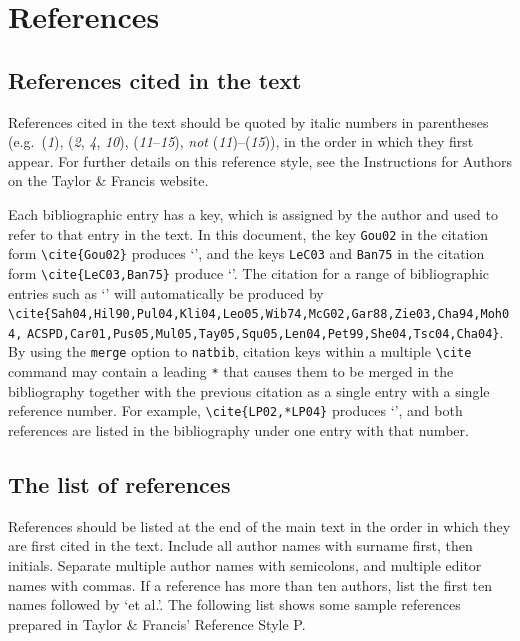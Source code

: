 \documentclass[]{interact}
\theoremstyle{plain}%
\theoremstyle{definition}
\theoremstyle{remark}
\begin{document}
\section{References}

\subsection{References cited in the text}

References cited in the text should be quoted by italic numbers in parentheses (e.g.\ (\textit{1}), (\textit{2}, \textit{4}, \textit{10}), (\textit{11}--\textit{15}), \emph{not} (\textit{11})--(\textit{15})), in the order in which they first appear. For further details on this reference style, see the Instructions for Authors on the Taylor \& Francis website.

Each bibliographic entry has a key, which is assigned by the author and used to refer to that entry in the text. In this document, the key \verb"Gou02" in the citation form \verb"\cite{Gou02}" produces `\cite{Gou02}', and the keys \verb"LeC03" and \verb"Ban75" in the citation form \verb"\cite{LeC03,Ban75}" produce `\cite{LeC03,Ban75}'. The citation for a range of bibliographic entries such as `\cite{Sah04,Hil90,Pul04,Kli04,Leo05,Wib74,McG02,Gar88,Zie03,Cha94,Moh04,ACSPD,Car01,Pus05,Mul05,Tay05,Squ05,Len04,Pet99,She04,Tsc04,Cha04}' will automatically be produced by \verb"\cite{Sah04,Hil90,Pul04,Kli04,Leo05,Wib74,McG02,Gar88,Zie03,Cha94,Moh04," \verb"ACSPD,Car01,Pus05,Mul05,Tay05,Squ05,Len04,Pet99,She04,Tsc04,Cha04}". By using the \verb"merge" option to \verb"natbib", citation keys within a multiple \verb"\cite" command may contain a leading \verb"*" that causes them to be merged in the bibliography together with the previous citation as a single entry with a single reference number. For example, \verb"\cite{LP02,*LP04}" produces `\cite{LP02,*LP04}', and both references are listed in the bibliography under one entry with that number.


\subsection{The list of references}

References should be listed at the end of the main text in the order in which they are first cited in the text. Include all author names with surname first, then initials. Separate multiple author names with semicolons, and multiple editor names with commas. If a reference has more than ten authors, list the first ten names followed by `et al.'. The following list shows some sample references prepared in Taylor \& Francis' Reference Style P.
\end{document}
